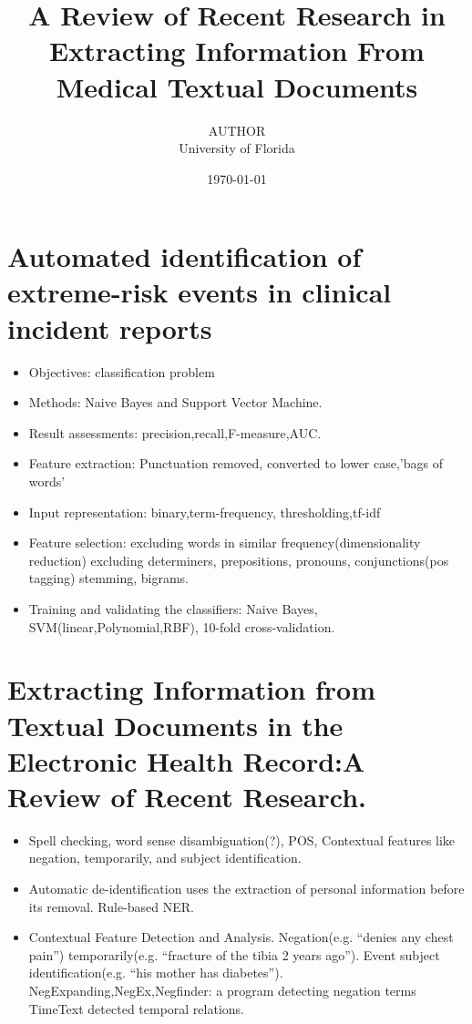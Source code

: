 \documentclass[pdftext,twoside,11pt]{article}
\title{A Review of Recent Research in Extracting Information From Medical Textual Documents}
\author{AUTHOR\\
  University of Florida\\
}
\date{\today}
\begin{document}
\maketitle



\section{Automated identification of extreme-risk events in clinical incident reports}
\label{sec:intro} 
\begin{itemize}
\item Objectives: classification problem
\item Methods: Naive Bayes and Support Vector Machine. 
\item Result assessments: precision,recall,F-measure,AUC.
\item Feature extraction:  Punctuation removed, converted to lower case,'bags of words'
\item Input representation: binary,term-frequency, thresholding,tf-idf
\item Feature selection: excluding words in similar frequency(dimensionality reduction)
                              excluding determiners, prepositions, pronouns, conjunctions(pos tagging)
                              stemming, bigrams.
\item Training and validating the classifiers: Naive Bayes, SVM(linear,Polynomial,RBF), 10-fold cross-validation.
\end{itemize}
\section{Extracting Information from Textual Documents
 in the Electronic Health Record:A Review of Recent Research.}
\label{sec:intro} 
\begin{itemize}
\item Spell checking, word sense disambiguation(?), POS, Contextual features like negation, temporarily, and subject identification.

\item Automatic de-identification uses the extraction of personal information before its removal. Rule-based NER.
\item Contextual Feature Detection and Analysis.
             Negation(e.g. “denies any chest pain”) temporarily(e.g. “fracture of the tibia 2 years ago”). Event subject identification(e.g. “his mother has diabetes”). 
                          NegExpanding,NegEx,Negfinder: a program detecting negation terms 
                          TimeText detected temporal relations. 
\end{itemize}
\end{document}
